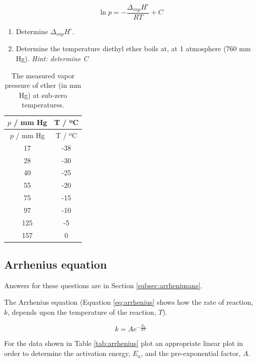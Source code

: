 \documentclass[
]{book}
\providecommand{\tightlist}{%
  \setlength{\itemsep}{0pt}\setlength{\parskip}{0pt}}
\begin{document}
\begin{equation}
\ln p = -\frac{\Delta_{vap}H^\circ}{RT}+C
\label{eq:clausius}
\end{equation}

\begin{enumerate}
\def\labelenumi{\arabic{enumi}.}
\tightlist
\item
  Determine \(\Delta _{vap}H^\circ\).
\item
  Determine the temperature diethyl ether boils at, at 1 atmosphere (760 mm Hg). \emph{Hint: determine C}
\end{enumerate}

\begin{longtable}[]{@{}cc@{}}
\caption{\label{tab:ether} The measured vapor pressure of ether (in mm Hg) at sub-zero temperatures.}\tabularnewline
\toprule
\(p\) / mm Hg & T / ºC \\
\midrule
\endfirsthead
\toprule
\(p\) / mm Hg & T / ºC \\
\midrule
\endhead
17 & -38 \\
28 & -30 \\
40 & -25 \\
55 & -20 \\
75 & -15 \\
97 & -10 \\
125 & -5 \\
157 & 0 \\
\bottomrule
\end{longtable}

\hypertarget{subsec:arrhenius}{%
\subsection{Arrhenius equation}\label{subsec:arrhenius}}

Answers for these questions are in Section \ref{subsec:arrheniusans}.

The Arrhenius equation (Equation \eqref{eq:arrhenius} shows how the rate of reaction, \(k\), depends upon the temperature of the reaction, \(T\)).

\begin{equation}
k=Ae^{-\frac{E_a}{RT}}
\label{eq:arrhenius}
\end{equation}

For the data shown in Table \ref{tab:arrhenius} plot an appropriate linear plot in order to determine the activation energy, \(E_a\), and the pre-exponential factor, \(A\).
\end{document}
